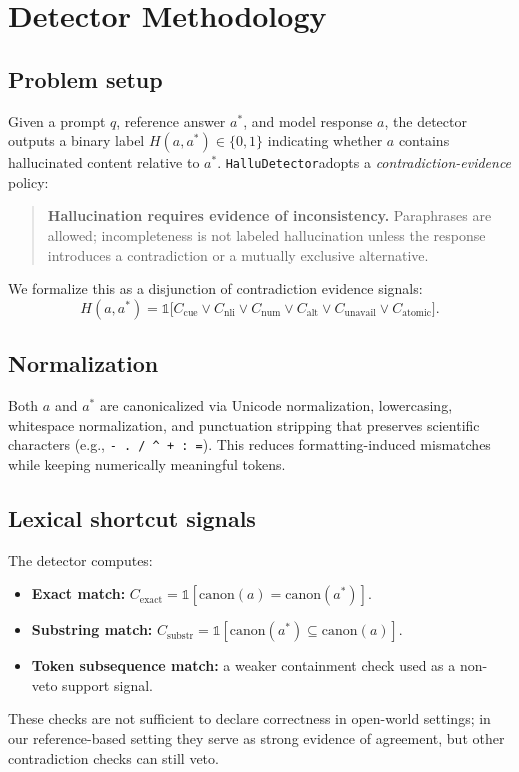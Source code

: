 \documentclass[11pt]{article}
\newcommand{\dataset}{\texttt{HalluDetector}}
\begin{document}
\section{Detector Methodology}
\label{sec:method}
\subsection{Problem setup}
Given a prompt \(q\), reference answer \(a^*\), and model response \(a\), the detector outputs a binary label \(H(a,a^*) \in \{0,1\}\) indicating whether \(a\) contains hallucinated content relative to \(a^*\). \dataset adopts a \emph{contradiction-evidence} policy:

\begin{quote}
\textbf{Hallucination requires evidence of inconsistency.} Paraphrases are allowed; incompleteness is not labeled hallucination unless the response introduces a contradiction or a mutually exclusive alternative.
\end{quote}

We formalize this as a disjunction of contradiction evidence signals:
\begin{equation}
H(a,a^*) = \mathbb{1}\big[ C_{\text{cue}} \lor C_{\text{nli}} \lor C_{\text{num}} \lor C_{\text{alt}} \lor C_{\text{unavail}} \lor C_{\text{atomic}} \big].
\end{equation}

\subsection{Normalization}
Both \(a\) and \(a^*\) are canonicalized via Unicode normalization, lowercasing, whitespace normalization, and punctuation stripping that preserves scientific characters (e.g., \texttt{- . / \^{} + : =}). This reduces formatting-induced mismatches while keeping numerically meaningful tokens.

\subsection{Lexical shortcut signals}
The detector computes:
\begin{itemize}[leftmargin=1.4em]
  \item \textbf{Exact match:} \(C_{\text{exact}} = \mathbb{1}[\text{canon}(a)=\text{canon}(a^*)]\).
  \item \textbf{Substring match:} \(C_{\text{substr}} = \mathbb{1}[\text{canon}(a^*) \subseteq \text{canon}(a)]\).
  \item \textbf{Token subsequence match:} a weaker containment check used as a non-veto support signal.
\end{itemize}
These checks are not sufficient to declare correctness in open-world settings; in our reference-based setting they serve as strong evidence of agreement, but other contradiction checks can still veto.
\end{document}
